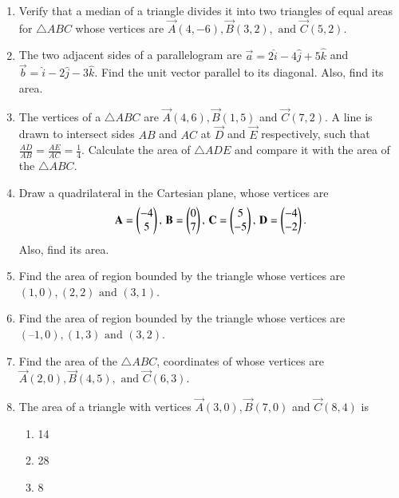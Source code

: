 \begin{enumerate}[label=\thesubsection.\arabic*,ref=\thesubsection.\theenumi]
\item Verify that a median of a triangle divides it into two triangles of equal areas for $\triangle ABC$ whose vertices are $\vec{A}(4, -6), \vec{B}(3, 2), \text{ and } \vec{C}(5, 2)$. 
		\label{10/7/3/5}
		\\
\solution
		
\item The two adjacent sides of a parallelogram are 
$\vec{a}= 2\hat{i}-4\hat{j}+5\hat{k}$  and  $\vec{b} =\hat{i}-2\hat{j}-3\hat{k}$.
Find the unit vector parallel to its diagonal. Also, find its area.\\
	\solution
		
\item The vertices of a $\triangle ABC$ are $\vec{A}(4,6), \vec{B}(1,5)$ and  $\vec{C}(7,2)$. A line is drawn to intersect sides $AB$ and $AC$ at $\vec{D}$ and $\vec{E}$ respectively, such that $\frac{AD}{AB} = \frac{AE}{AC} = \frac{1}{4}$. Calculate the area of $\triangle ADE$ and compare it with the area of the $\triangle ABC$.
\\
\solution
	
    \item Draw a quadrilateral in the Cartesian plane, whose vertices are 
    \begin{align}
        \mathbf{A} = \begin{pmatrix}-4\\5\end{pmatrix},\, \mathbf{B} = \begin{pmatrix}0\\7\end{pmatrix},\, 
        \mathbf{C} = \begin{pmatrix}5\\-5\end{pmatrix},\, \mathbf{D} = \begin{pmatrix}-4\\-2\end{pmatrix}.
    \end{align}
    Also, find its area.
\label{chapters/11/10/1/1}
   \\ 
    \solution 

\item Find the area of region bounded by the triangle whose
	vertices are $(1, 0), (2, 2) \text{ and } (3, 1)$. 
\item Find the area of region bounded by the triangle whose vertices
	are $(– 1, 0), (1, 3) \text{ and } (3, 2)$. 
\item Find the area of the $\triangle ABC$, coordinates of whose vertices are $\vec{A}(2, 0), \vec{B}(4, 5), \text{ and } \vec{C}(6, 3)$.
\item The area of a triangle with vertices $\vec{A}(3, 0), \vec{B}(7, 0)$ and  $\vec{C}(8, 4)$ is
\begin{enumerate}
\item 14
\item 28
\item 8

\end{enumerate}
\end{enumerate}
